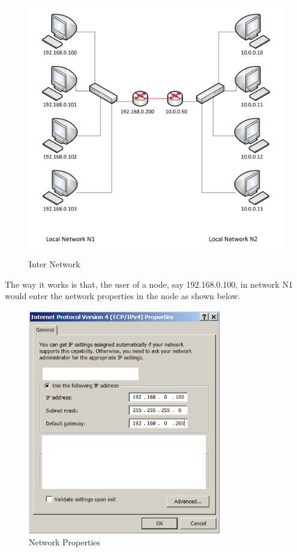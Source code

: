 	\begin{figure}[h]
	\centering
	\includegraphics[width = \textwidth]{partNW/RouterConnectingNetworks}
	\caption{Inter Network}
	\label{fig:routerConnectingNWs}
	\end{figure}

The way it works is that, the user of a node, say 192.168.0.100, in network N1 would enter the network properties in the node as shown below. 

	\begin{figure}[h]
	\centering
	\includegraphics[width = 0.75\textwidth]{partNW/IP4Properties}
	\caption{Network Properties}
	\label{fig:ipv4DialogBox}
	\end{figure}

